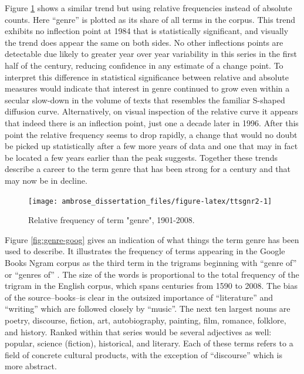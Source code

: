 \documentclass[]{book}
\theoremstyle{definition}
\theoremstyle{definition}
\theoremstyle{definition}
\theoremstyle{remark}
\begin{document}
Figure \ref{fig:ttsgnr2} shows a similar trend but using relative
frequencies instead of absolute counts. Here ``genre'' is plotted as its
share of all terms in the corpus. This trend exhibits no inflection
point at 1984 that is statistically significant, and visually the trend
does appear the same on both sides. No other inflections points are
detectable due likely to greater year over year variability in this
series in the first half of the century, reducing confidence in any
estimate of a change point. To interpret this difference in statistical
significance between relative and absolute measures would indicate that
interest in genre continued to grow even within a secular slow-down in
the volume of texts that resembles the familiar S-shaped diffusion
curve. Alternatively, on visual inspection of the relative curve it
appears that indeed there is an inflection point, just one a decade
later in 1996. After this point the relative frequency seems to drop
rapidly, a change that would no doubt be picked up statistically after a
few more years of data and one that may in fact be located a few years
earlier than the peak suggests. Together these trends describe a career
to the term genre that has been strong for a century and that may now be
in decline.

\begin{figure}

{\centering \texttt{[image: ambrose\_dissertation\_files/figure-latex/ttsgnr2-1]} 

}

\caption{Relative frequency of term "genre", 1901-2008.}\label{fig:ttsgnr2}
\end{figure}

Figure \ref{fig:genre-goog} gives an indication of what things the term
genre has been used to describe. It illustrates the frequency of terms
appearing in the Google Books Ngram corpus as the third term in the
trigrams beginning with ``genre of'' or ``genres of''
\citep{2012Google}. The size of the words is proportional to the total
frequency of the trigram in the English corpus, which spans centuries
from 1590 to 2008. The bias of the source--books--is clear in the
outsized importance of ``literature'' and ``writing'' which are followed
closely by ``music''. The next ten largest nouns are poetry, discourse,
fiction, art, autobiography, painting, film, romance, folklore, and
history. Ranked within that series would be several adjectives as well:
popular, science (fiction), historical, and literary. Each of these
terms refers to a field of concrete cultural products, with the
exception of ``discourse'' which is more abstract.
\end{document}
